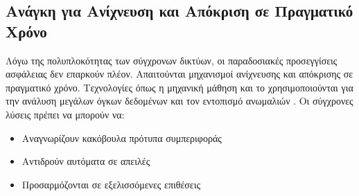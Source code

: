 \subsection{Ανάγκη για Ανίχνευση και Απόκριση σε Πραγματικό Χρόνο}

Λόγω της πολυπλοκότητας των σύγχρονων δικτύων, οι παραδοσιακές προσεγγίσεις ασφάλειας δεν επαρκούν πλέον. Απαιτούνται μηχανισμοί ανίχνευσης και απόκρισης σε πραγματικό χρόνο. Τεχνολογίες όπως η μηχανική μάθηση και το  χρησιμοποιούνται για την ανάλυση μεγάλων όγκων δεδομένων και τον εντοπισμό ανωμαλιών \cite{nguyen2018deep}. Οι σύγχρονες λύσεις πρέπει να μπορούν να:
\begin{itemize}
    \item Αναγνωρίζουν κακόβουλα πρότυπα συμπεριφοράς
    \item Αντιδρούν αυτόματα σε απειλές
    \item Προσαρμόζονται σε εξελισσόμενες επιθέσεις
\end{itemize}